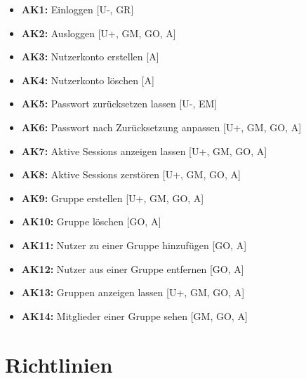 \documentclass[fontsize=12pt,DIV=14,BCOR=10mm,a4paper,parskip=half-,ngerman,english,bibliography=totocnumbered]{scrreprt}
\begin{document}
\begin{itemize}
  \item \textbf{AK1:} Einloggen [U-, GR]
  \item \textbf{AK2:} Ausloggen [U+, GM, GO, A]
  \item \textbf{AK3:} Nutzerkonto erstellen [A]
  \item \textbf{AK4:} Nutzerkonto löschen [A]
  \item \textbf{AK5:} Passwort zurücksetzen lassen [U-, EM]
  \item \textbf{AK6:} Passwort nach Zurücksetzung anpassen [U+, GM, GO, A]
  \item \textbf{AK7:} Aktive Sessions anzeigen lassen [U+, GM, GO, A]
  \item \textbf{AK8:} Aktive Sessions zerstören [U+, GM, GO, A]
  \item \textbf{AK9:} Gruppe erstellen [U+, GM, GO, A]
  \item \textbf{AK10:} Gruppe löschen [GO, A]
  \item \textbf{AK11:} Nutzer zu einer Gruppe hinzufügen [GO, A]
  \item \textbf{AK12:} Nutzer aus einer Gruppe entfernen [GO, A]
  \item \textbf{AK13:} Gruppen anzeigen lassen [U+, GM, GO, A]
  \item \textbf{AK14:} Mitglieder einer Gruppe sehen [GM, GO, A]
\end{itemize}

\chapter{Richtlinien}

\end{document}
